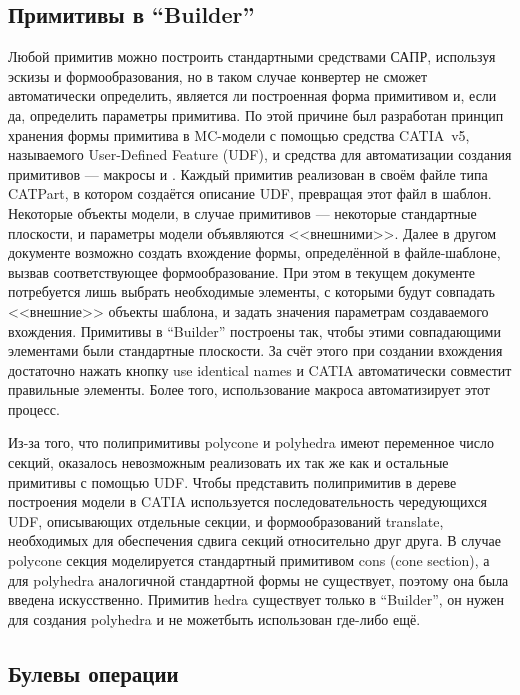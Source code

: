 \subsection{Примитивы в ``Builder''}\label{sec:Primitives}

Любой примитив можно построить стандартными средствами САПР, используя эскизы и формообразования, но в таком случае конвертер не сможет автоматически определить, является ли построенная форма примитивом и, если да, определить параметры примитива. По этой причине был разработан принцип хранения формы примитива в MC-модели с помощью средства CATIA~v5, называемого User-Defined Feature (UDF), и средства для автоматизации создания примитивов --- макросы  и . Каждый примитив реализован в своём файле типа CATPart, в котором создаётся описание UDF, превращая этот файл в шаблон. Некоторые объекты модели, в случае примитивов --- некоторые стандартные плоскости, и параметры модели объявляются <<внешними>>. Далее в другом документе возможно создать вхождение формы, определённой в файле-шаблоне, вызвав соответствующее формообразование. При этом в текущем документе потребуется лишь выбрать необходимые элементы, с которыми будут совпадать <<внешние>> объекты шаблона, и задать значения параметрам создаваемого вхождения. Примитивы в ``Builder'' построены так, чтобы этими совпадающими элементами были стандартные плоскости. За счёт этого при создании вхождения достаточно нажать кнопку use identical names и CATIA автоматически совместит правильные элементы. Более того, использование макроса  автоматизирует этот процесс.

Из-за того, что полипримитивы polycone и polyhedra имеют переменное число секций, оказалось невозможным реализовать их так же как и остальные примитивы с помощью UDF. Чтобы представить полипримитив в дереве построения модели в CATIA используется последовательность чередующихся UDF, описывающих отдельные секции, и формообразований translate, необходимых для обеспечения сдвига секций относительно друг друга. В случае polycone секция моделируется стандартный примитивом cons (cone section), а для polyhedra аналогичной стандартной формы не существует, поэтому она была введена искусственно. Примитив hedra существует только в ``Builder'', он нужен для создания polyhedra и не можетбыть использован где-либо ещё.

\subsection{Булевы операции}\label{sec:Boolean}

